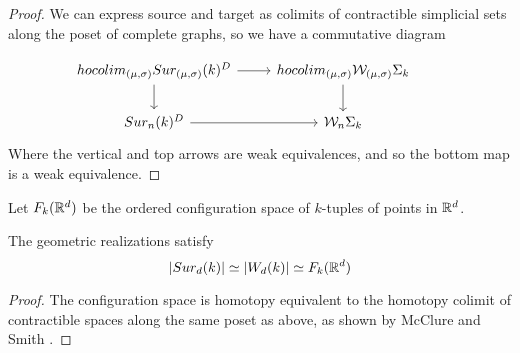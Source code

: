 \begin{proof}
We can express source and target as colimits of contractible %
simplicial sets along the poset of complete graphs,
so we have a commutative diagram

	\begin{equation*}
		\begin{tikzcd}
			hocolim_{(\mu,\sigma)}Sur_{(\mu,\sigma)}(k)^{D} \arrow[r] \arrow[d]& hocolim_{(\mu,\sigma)}\mathcal{W}_{(\mu,\sigma)}\Sigma_{k} \arrow[d] \\
			Sur_{n}(k)^{D}\arrow[r] & \mathcal{W}_{n}\Sigma_{k}&
		\end{tikzcd}
	\end{equation*}
	Where the vertical and top arrows
	are weak equivalences, and so the bottom map is a weak equivalence.

\end{proof}

Let  $F_k(\mathbb{R}^{d})$ be the ordered configuration space of $k$-tuples of points in  $\mathbb{R}^{d}$.

\begin{proposition}
The geometric realizations satisfy
$$|Sur_d(k)| \simeq |W_d(k)|  \simeq F_k(\mathbb{R}^{d})$$
\end{proposition}

\begin{proof}
The configuration space is homotopy equivalent to the homotopy colimit of contractible spaces along the same poset as above, as shown by McClure and Smith \cite{MS}. %
\end{proof}
